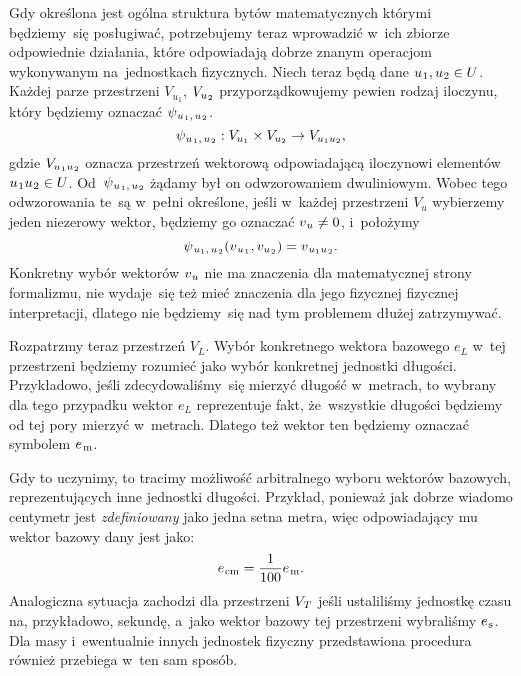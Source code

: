 \documentclass[a4paper,11pt]{article}
\numberwithin{equation}{section}
\begin{document}
Gdy określona jest ogólna struktura bytów matematycznych którymi
będziemy~się posługiwać, potrzebujemy teraz wprowadzić w~ich zbiorze
odpowiednie działania, które odpowiadają dobrze znanym operacjom
wykonywanym na~jednostkach fizycznych. Niech teraz będą dane
$u_{ \HorSpaceOne 1 }, u_{ \HorSpaceOne 2 } \in U$. Każdej parze przestrzeni
$V_{ u_{ 1 } }$, $V_{ u_{ \HorSpaceOne 2 } }$ przyporządkowujemy pewien rodzaj
iloczynu, który będziemy oznaczać
$\psi_{ \HorSpaceOne u_{ \HorSpaceOne 1 }, \, u_{ \HorSpaceOne 2 } }$.
\begin{equation}
  \label{eq:Mechanika-Rozwazania-ogolne-07}
  \psi_{ \HorSpaceOne u_{ \HorSpaceOne 1 }, \, u_{ \HorSpaceOne 2 } } :
  V_{ u_{ 1 } } \times V_{ u_{ 2 } } \to V_{ u_{ 1 } u_{ 2 } },
\end{equation}
gdzie $V_{ u_{ \HorSpaceOne 1 } u _{ \HorSpaceOne 2 } }$ oznacza przestrzeń
wektorową odpowiadającą iloczynowi elementów
$u_{ \HorSpaceOne 1 } u_{ \HorSpaceOne 2 } \in U$.
Od~$\psi_{ \HorSpaceOne u_{ \HorSpaceOne 1 }, \, u_{ \HorSpaceOne 2 } }$ żądamy był on
odwzorowaniem dwuliniowym. Wobec tego odwzorowania te~są w~pełni
określone, jeśli w~każdej przestrzeni $V_{ u }$ wybierzemy jeden
niezerowy wektor, będziemy go oznaczać $v_{ \HorSpaceOne u } \neq 0$,
i~położymy
\begin{equation}
  \label{eq:Mechanika-Rozwazania-ogolne-08}
  \psi_{ \HorSpaceTwo u_{ 1 }, \, u_{ \HorSpaceOne 2 } }(
  v_{ \HorSpaceOne u_{ \HorSpaceOne 1 } }, v_{ u_{ \HorSpaceOne 2 } } ) =
  v_{ \HorSpaceOne u_{ 1 } u_{ \HorSpaceOne 2 } }.
\end{equation}
Konkretny wybór wektorów $v_{ \HorSpaceOne u }$ nie ma znaczenia dla
matematycznej strony formalizmu, nie wydaje~się też mieć znaczenia dla
jego fizycznej fizycznej interpretacji, dlatego nie będziemy~się
nad tym problemem dłużej zatrzymywać.

Rozpatrzmy teraz przestrzeń $V_{ L }$. Wybór konkretnego wektora bazowego
$e_{ L }$ w~tej przestrzeni będziemy rozumieć jako wybór konkretnej
jednostki długości. Przykładowo, jeśli zdecydowaliśmy~się mierzyć
długość w~metrach, to wybrany dla tego przypadku wektor $e_{ L }$
reprezentuje fakt, że~wszystkie długości będziemy od tej pory mierzyć
w~metrach. Dlatego też wektor ten będziemy oznaczać symbolem
$e_{ \HorSpaceTwo \si{m} }$.

Gdy to uczynimy, to tracimy możliwość arbitralnego wyboru wektorów bazowych,
reprezentujących inne jednostki długości. Przykład, ponieważ jak dobrze
wiadomo centymetr jest \textit{zdefiniowany} jako jedna setna metra, więc
odpowiadający mu wektor bazowy dany jest jako:
\begin{equation}
  \label{eq:Mechanika-Rozwazania-ogolne-09}
  e_{ \HorSpaceOne \si{cm} } = \frac{ 1 }{ 100 } e_{ \HorSpaceTwo \si{m} }.
\end{equation}
Analogiczna sytuacja zachodzi dla przestrzeni $V_{ \HorSpaceOne T }$ jeśli
ustaliliśmy jednostkę czasu na, przykładowo, sekundę, a~jako wektor bazowy
tej przestrzeni wybraliśmy $e_{ \HorSpaceOne \si{s} }$. Dla masy i~ewentualnie
innych jednostek fizyczny przedstawiona procedura również przebiega w~ten
sam sposób.
\end{document}
